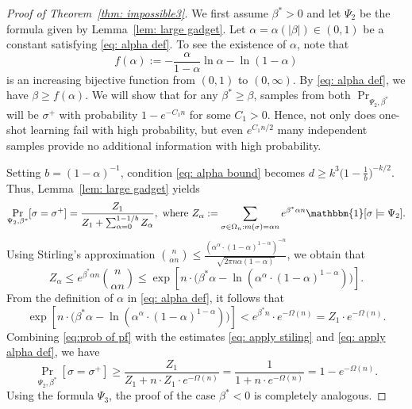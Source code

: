 \documentclass[11pt]{article}
\theoremstyle{definition}
\theoremstyle{remark}
\begin{document}
\begin{proof}[Proof of Theorem~\ref{thm: impossible3}]
    We first assume $\beta^*>0$ and
    let $\Psi_2$ be the formula given by Lemma~\ref{lem: large gadget}.
    Let $\alpha = \alpha(|\beta|) \in (0,1)$ be a constant satisfying 
    \eqref{eq: alpha def}.
    To see the existence of $\alpha$, note that 
    \[
    f(\alpha):=-\frac{\alpha}{1-\alpha} \ln{\alpha} - \ln{(1-\alpha)}
    \]
    is an increasing bijective function from $(0,1)$ to $(0,\infty)$.
    By \eqref{eq: alpha def}, we have $\beta\ge f(\alpha)$.
    We will show that for any $\beta^* \ge \beta$, samples from both  $\Pr_{\Psi_2, \beta^*}$ will be $\sigma^+$ with  probability $1-e^{-C_1 n}$ for some $C_1>0$. Hence, not only does one-shot learning fail with high probability, but even $e^{C_1n/2}$ many independent
  samples provide no additional information with high probability.

    Setting $b=(1-\alpha)^{-1}$, condition \eqref{eq: alpha bound} becomes $d\ge k^3\big(1-\frac{1}{b}\big)^{-k/2}$. Thus,  Lemma~\ref{lem: large gadget} yields 
    \begin{equation} \label{eq:prob of pf}
        \Pr_{\Psi_2, \beta^*} 
        [\sigma = \sigma ^+] 
        = \frac{Z_1}{Z_1 + \sum_{\alpha=0}^{1-1/b} Z_\alpha }, \text{ where }
        Z_\alpha:=\sum_{\sigma\in\Omega_n: m(\sigma)=\alpha n} e^{\beta^* \alpha n} \mathbbm{1}[\sigma\models \Psi_2].
    \end{equation}
    Using Stirling's approximation $
            \binom{n}{\alpha n} \le \frac{(\alpha^\alpha\cdot (1-\alpha)^{1-\alpha})^{-n}}{\sqrt{2\pi n \alpha(1-\alpha)}}$, we obtain that 
    \begin{equation}
        \label{eq: apply stiling}   Z_\alpha \le e^{\beta^* \alpha n} \binom{n}{\alpha n} \le 
    \exp{\left[ n\cdot 
        \big( 
            \beta^* \alpha - \ln(\alpha^\alpha\cdot (1-\alpha)^{1-\alpha})
        \big)
    \right]}.
    \end{equation}
    From the definition of $\alpha$ in \eqref{eq: alpha def}, it follows that 
    \begin{equation}
        \label{eq: apply alpha def}    \exp{\left[ n\cdot 
        \big( 
            \beta^* \alpha - \ln(\alpha^\alpha\cdot (1-\alpha)^{1-\alpha})
        \big)
    \right]} 
    < e^{\beta^* n}\cdot e^{-\Omega(n)} = Z_1\cdot  e^{-\Omega(n)}.
    \end{equation}
    Combining \eqref{eq:prob of pf} with the estimates \eqref{eq: apply stiling} and \eqref{eq: apply alpha def}, we have 
    \[
    \Pr_{\Psi_2, \beta^*} 
        [\sigma = \sigma ^+] 
        \ge \frac{Z_1}{Z_1 + n\cdot Z_1 \cdot e^{-\Omega(n)}}
        = \frac{1}{1 + n \cdot e^{-\Omega(n)}} 
        = 1 - e^{-\Omega(n)}.
    \]
    Using the formula $\Psi_3$, the proof of the case $\beta^*<0$ is completely analogous. 
\end{proof}
  
\end{document}
